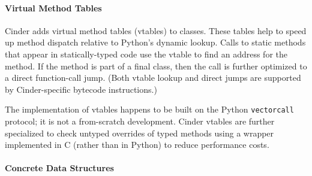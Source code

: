 \documentclass[english,cleveref,submission]{programming}
\newcommand{\code}[1]{\texttt{#1}}
\begin{document}
\paragraph{Virtual Method Tables}
\label{s:vtable}


Cinder adds virtual method tables (vtables) to classes.
These tables help to speed up method dispatch relative to Python's
dynamic lookup.
Calls to static methods that appear in statically-typed
code use the vtable to find an address for the method.
If the method is part of a final class, then the call is further optimized
to a direct function-call jump.
(Both vtable lookup and direct jumps are supported by Cinder-specific bytecode
instructions.)

The implementation of vtables happens to be built on the Python \code{vectorcall}
protocol; it is not a from-scratch development.
Cinder vtables are further specialized to check untyped overrides of typed methods
using a wrapper implemented in C (rather than in Python) to reduce performance costs.



\paragraph{Concrete Data Structures}
\label{s:chkdict-impl}
\end{document}
